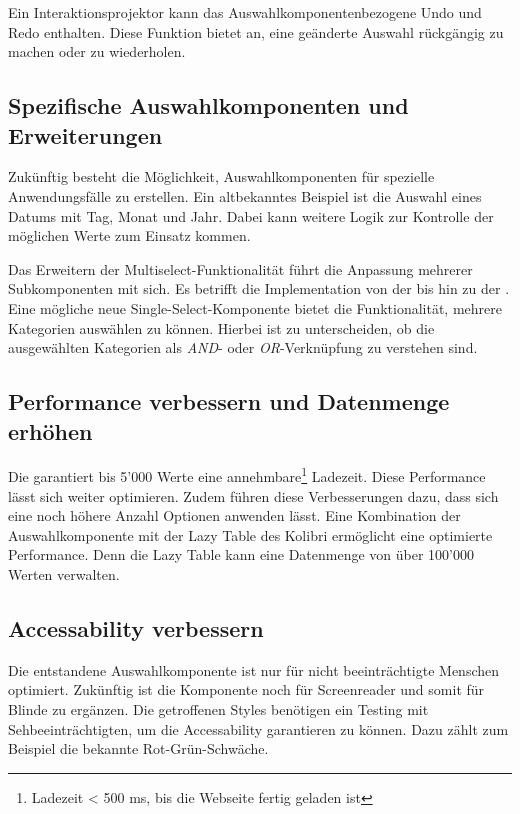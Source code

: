 Ein Interaktionsprojektor kann das Auswahlkomponentenbezogene Undo und Redo enthalten. 
Diese Funktion bietet an, eine geänderte Auswahl rückgängig zu machen oder zu wiederholen. 


\subsection{Spezifische Auswahlkomponenten und Erweiterungen}
\label{sec:specificComponents}

Zukünftig besteht die Möglichkeit, Auswahlkomponenten für spezielle Anwendungsfälle zu erstellen. 
Ein altbekanntes Beispiel ist die Auswahl eines Datums mit Tag, Monat und Jahr. 
Dabei kann weitere Logik zur Kontrolle der möglichen Werte zum Einsatz kommen. 

Das Erweitern der Multiselect-Funktionalität führt die Anpassung mehrerer Subkomponenten mit sich. 
Es betrifft die Implementation von der  bis hin zu der . 
Eine mögliche neue Single-Select-Komponente bietet die Funktionalität, mehrere Kategorien auswählen zu können. 
Hierbei ist zu unterscheiden, ob die ausgewählten Kategorien als \emph{AND}- oder \emph{OR}-Verknüpfung zu verstehen sind. 


\subsection{Performance verbessern und Datenmenge erhöhen}
\label{sec:betterPerformance}

Die  garantiert bis 5'000 Werte eine annehmbare\footnote{
    Ladezeit < 500 ms, bis die Webseite fertig geladen ist
} Ladezeit. 
Diese Performance lässt sich weiter optimieren. 
Zudem führen diese Verbesserungen dazu, dass sich eine noch höhere Anzahl Optionen anwenden lässt. 
Eine Kombination der Auswahlkomponente mit der Lazy Table des Kolibri ermöglicht eine optimierte Performance. 
Denn die Lazy Table kann eine Datenmenge von über 100'000 Werten verwalten. 


\subsection{Accessability verbessern}
\label{sec:betterAccessability}

Die entstandene Auswahlkomponente ist nur für nicht beeinträchtigte Menschen optimiert. 
Zukünftig ist die Komponente noch für Screenreader und somit für Blinde zu ergänzen. 
Die getroffenen Styles benötigen ein Testing mit Sehbeeinträchtigten, um die Accessability garantieren zu können. 
Dazu zählt zum Beispiel die bekannte Rot-Grün-Schwäche. 


